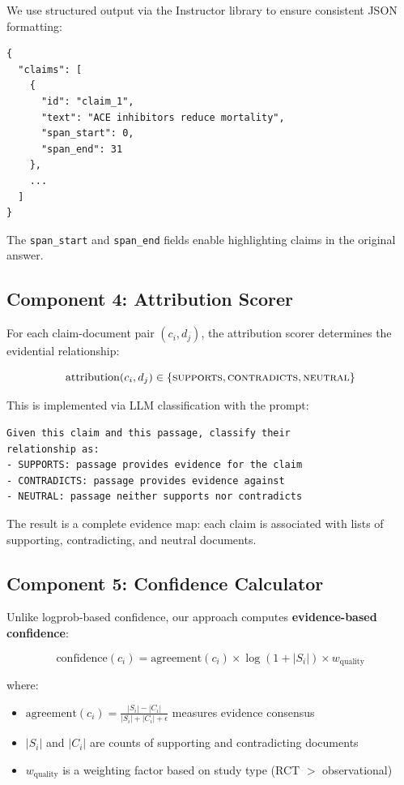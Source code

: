 \documentclass[11pt,a4paper]{article}
\begin{document}
We use structured output via the Instructor library to ensure consistent JSON formatting:

\begin{lstlisting}
{
  "claims": [
    {
      "id": "claim_1",
      "text": "ACE inhibitors reduce mortality",
      "span_start": 0,
      "span_end": 31
    },
    ...
  ]
}
\end{lstlisting}

The \texttt{span\_start} and \texttt{span\_end} fields enable highlighting claims in the original answer.

\subsection{Component 4: Attribution Scorer}

For each claim-document pair $(c_i, d_j)$, the attribution scorer determines the evidential relationship:

\begin{equation}
    \text{attribution}(c_i, d_j) \in \{\textsc{supports}, \textsc{contradicts}, \textsc{neutral}\}
\end{equation}

This is implemented via LLM classification with the prompt:

\begin{lstlisting}
Given this claim and this passage, classify their 
relationship as:
- SUPPORTS: passage provides evidence for the claim
- CONTRADICTS: passage provides evidence against
- NEUTRAL: passage neither supports nor contradicts
\end{lstlisting}

The result is a complete evidence map: each claim is associated with lists of supporting, contradicting, and neutral documents.

\subsection{Component 5: Confidence Calculator}

Unlike logprob-based confidence, our approach computes \textbf{evidence-based confidence}:

\begin{equation}
    \text{confidence}(c_i) = \text{agreement}(c_i) \times \log(1 + |S_i|) \times w_{\text{quality}}
\end{equation}

where:
\begin{itemize}
    \item $\text{agreement}(c_i) = \frac{|S_i| - |C_i|}{|S_i| + |C_i| + \epsilon}$ measures evidence consensus
    \item $|S_i|$ and $|C_i|$ are counts of supporting and contradicting documents
    \item $w_{\text{quality}}$ is a weighting factor based on study type (RCT $>$ observational)
\end{itemize}
\end{document}
